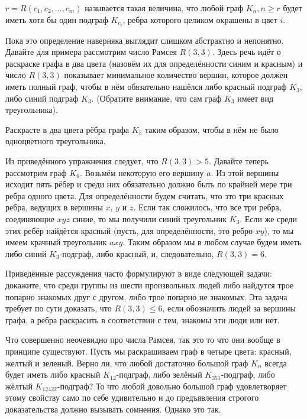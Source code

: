 \begin{definition}
 $r = R(c_1, c_2, \ldots, c_m)$ называется такая величина, что любой граф $K_n, n\ge r$ будет иметь хотя бы один подграф $K_{c_i}$, ребра которого целиком окрашены в цвет $i$.
\end{definition}

Пока это определение наверняка выглядит слишком абстрактно и непонятно. Давайте для примера рассмотрим число Рамсея $R(3, 3)$. Здесь речь идёт о раскраске графа в два цвета (назовём их для определённости синим и красным) и число $R(3, 3)$ показывает минимальное количество вершин, которое должен иметь полный граф, чтобы в нём обязательно нашёлся либо красный подграф $K_3$, либо синий подграф $K_3$. (Обратите внимание, что сам граф $K_3$ имеет вид треугольника).

\begin{exercise}
Раскрасте в два цвета рёбра графа $K_5$ таким образом, чтобы в нём не было одноцветного треугольника.
\end{exercise}

Из приведённого упражнения следует, что $R(3,3)>5$. Давайте теперь рассмотрим граф $K_6$. Возьмём некоторую его вершину $a$. Из этой вершины исходит пять рёбер и среди них обязательно должно быть по крайней мере три ребра одного цвета. Для определённости будем считать, что это три красных ребра, ведущих в вершины $x$, $y$ и $z$. Если так сложилось, что все три ребра, соединяющие $xyz$ синие, то мы получили синий треугольник $K_3$. Если же среди этих ребёр найдётся красный (пусть, для определённости, это ребро $xy$), то мы имеем крачный треугольник $axy$. Таким образом мы в любом случае будем иметь либо синий $K_3$-подграф, либо красный, и, следовательно, $R(3, 3) = 6$.

Приведённые рассуждения часто формулируют в виде следующей задачи: докажите, что среди группы из шести произвольных людей либо найдутся трое попарно знакомых друг с другом, либо трое попарно не знакомых. Эта задача требует по сути доказать, что $R(3, 3) \le 6$, если обозначить людей за вершины графа, а ребра раскрасить в соответствии с тем, знакомы эти люди или нет.

Что совершенно неочевидно про числа Рамсея, так это то что они вообще в принципе существуют. Пусть мы раскрашиваем граф в четыре цвета: красный, желтый и зеленый. Верно ли, что любой достаточно большой граф $K_n$ всегда будет иметь либо красный $K_{12}$-подграф, либо зелёный $K_{351}$-подграф, либо жёлтый $K_{12422}$-подграф? То что любой довольно большой граф удовлетворяет этому свойству само по себе удивительно и до предъявления строгого доказательства должно вызывать сомнения. Однако это так.

